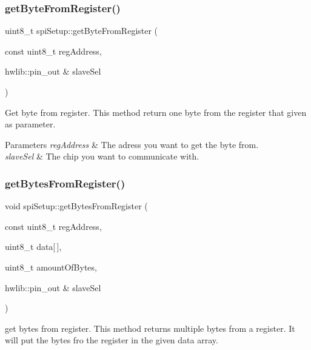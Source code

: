 \subsubsection{\texorpdfstring{get\+Byte\+From\+Register()}{getByteFromRegister()}}
{\footnotesize\ttfamily uint8\+\_\+t spi\+Setup\+::get\+Byte\+From\+Register (\begin{DoxyParamCaption}\item[{const uint8\+\_\+t}]{reg\+Address,  }\item[{hwlib\+::pin\+\_\+out \&}]{slave\+Sel }\end{DoxyParamCaption})}



Get byte from register.  This method return one byte from the register that given as parameter. 


\begin{DoxyParams}{Parameters}
{\em reg\+Address} & The adress you want to get the byte from. \\
\hline
{\em slave\+Sel} & The chip you want to communicate with. \\
\hline
\end{DoxyParams}
\mbox{\label{classspiSetup_a2dd360ed8351469fe8dbb78d25a73e1b}} 
\subsubsection{\texorpdfstring{get\+Bytes\+From\+Register()}{getBytesFromRegister()}}
{\footnotesize\ttfamily void spi\+Setup\+::get\+Bytes\+From\+Register (\begin{DoxyParamCaption}\item[{const uint8\+\_\+t}]{reg\+Address,  }\item[{uint8\+\_\+t}]{data\mbox{[}$\,$\mbox{]},  }\item[{uint8\+\_\+t}]{amount\+Of\+Bytes,  }\item[{hwlib\+::pin\+\_\+out \&}]{slave\+Sel }\end{DoxyParamCaption})}



get bytes from register.  This method returns multiple bytes from a register. It will put the bytes fro the register in the given data array. 


